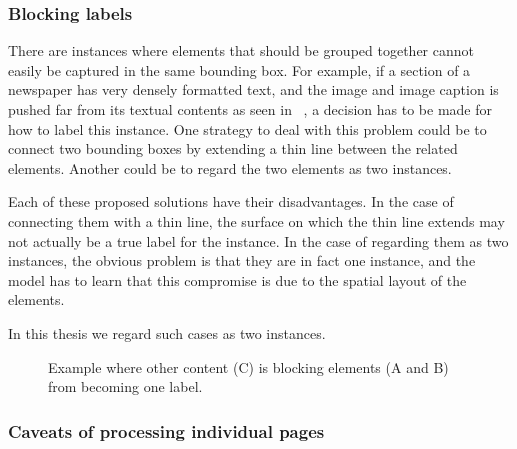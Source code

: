 \documentclass[oneside, english, bibtex]{kththesis}
\begin{document}
\subsubsection{Blocking labels}

There are instances where elements that should be grouped together cannot easily be captured in the same bounding box.
For example, if a section of a newspaper has very densely formatted text, and the image and image caption is pushed far from its textual contents as seen in ~, a decision has to be made for how to label this instance.
One strategy to deal with this problem could be to connect two bounding boxes by extending a thin line between the related elements. Another could be to regard the two elements as two instances.

Each of these proposed solutions have their disadvantages. In the case of connecting them with a thin line, the surface on which the thin line extends may not actually be a true label for the instance.
In the case of regarding them as two instances, the obvious problem is that they are in fact one instance, and the model has to learn that this compromise is due to the spatial layout of the elements.

In this thesis we regard such cases as two instances.

\begin{figure}[H]
\caption{Example where other content (C) is blocking elements (A and B) from becoming one label.}
\label{fig:blockingelements}%
\end{figure}

\subsubsection{Caveats of processing individual pages}
\label{subs:caveatsindividualpages}
\end{document}

